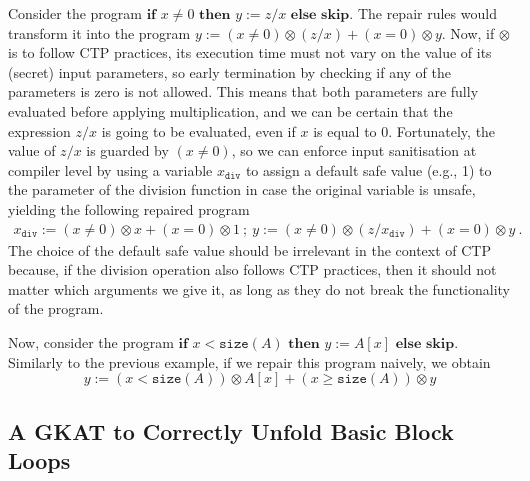 Consider the program $\textbf{if }x\neq 0\textbf{ then } y:=z/x \textbf{ else skip}$. The repair rules would transform it into the program $y:=(x\neq 0)\otimes (z/x)+(x=0)\otimes y$. Now, if $\otimes$ is to follow CTP practices, its execution time must not vary on the value of its (secret) input parameters, so early termination by checking if any of the parameters is zero is not allowed. This means that both parameters are fully evaluated before applying multiplication, and we can be certain that the expression $z/x$ is going to be evaluated, even if $x$ is equal to 0. Fortunately, the value of $z/x$ is guarded by $(x\neq 0)$, so we can enforce input sanitisation at compiler level by using a variable $x_\texttt{div}$ to assign a default safe value (e.g., 1) to the parameter of the division function in case the original variable is unsafe, yielding the following repaired program
\begin{align}
x_\texttt{div}:= (x\neq 0)\otimes x+(x=0)\otimes 1\ ;\ y:=(x\neq 0)\otimes (z/x_\texttt{div})+(x=0)\otimes y\ .
\end{align}
The choice of the default safe value should be irrelevant in the context of CTP because, if the division operation also follows CTP practices, then it should not matter which arguments we give it, as long as they do not break the functionality of the program. 

Now, consider the program $\textbf{if }x<\texttt{size}(A)\textbf{ then } y:=A[x] \textbf{ else skip}$. Similarly to the previous example, if we repair this program naively, we obtain 
\[y:=(x<\texttt{size}(A))\otimes A[x]+(x\geq\texttt{size}(A))\otimes y
\]


\subsection{A GKAT to Correctly Unfold Basic Block Loops}

